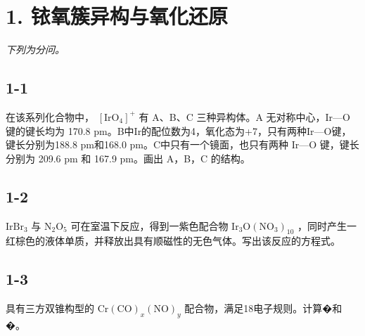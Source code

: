 \section*{1. 铱氧簇异构与氧化还原}
\textit{下列为分问。}

\subsection*{1-1}
在该系列化合物中， $[ \mathrm { I r O } _ { 4 } ] ^ { + }$ 有 A、B、C 三种异构体。A ⽆对称中⼼，Ir—O 键的键⻓均为 170.8 pm。B中Ir的配位数为4，氧化态为+7，只有两种Ir—O键，键⻓分别为188.8 pm和168.0 pm。C中只有⼀个镜⾯，也只有两种 Ir—O 键，键⻓分别为 209.6 pm 和 167.9 pm。画出 A，B，C 的结构。

\subsection*{1-2}
$\mathrm { I r B r _ { 3 } }$ 与 $\mathrm { N } _ { 2 } \mathrm { O } _ { 5 }$ 可在室温下反应，得到⼀紫⾊配合物 $\mathrm { I r _ { 3 } O ( N O _ { 3 } ) _ { 1 0 } }$ ，同时产⽣⼀红棕⾊的液体单质，并释放出具有顺磁性的⽆⾊⽓体。写出该反应的⽅程式。

\subsection*{1-3}
具有三⽅双锥构型的 $\mathrm { C r } ( \mathrm { C O } ) _ { x } ( \mathrm { N O } ) _ { y }$ 配合物，满⾜18电⼦规则。计算�和�。
